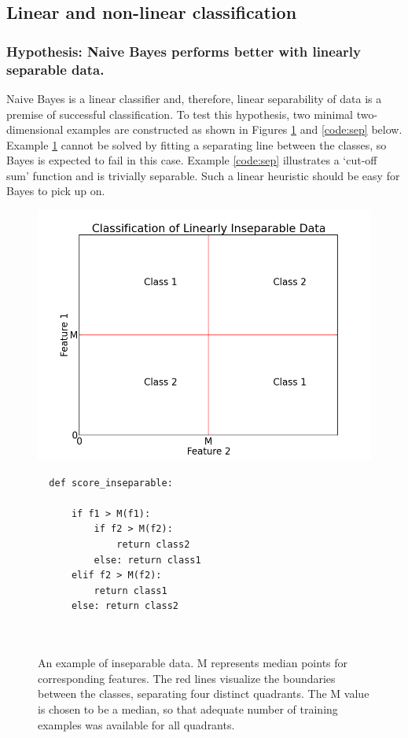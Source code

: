 \documentclass[12pt,notitlepage,twoside]{scrreprt}
\begin{document}
\subsection{Linear and non-linear classification}
\subsubsection*{Hypothesis: Naive Bayes performs better with linearly separable data.}

Naive Bayes is a linear classifier and, therefore, linear separability of data is a
premise of successful classification. To test this hypothesis, two minimal two-dimensional
examples are constructed as shown in Figures \ref{code:insep} and \ref{code:sep} below.
Example \ref{code:insep} cannot be solved by fitting a separating line between the
classes, so Bayes is expected to fail in this case. Example \ref{code:sep} illustrates a
`cut-off sum' function and is trivially separable. Such a linear heuristic should be easy
for Bayes to pick up on.

\begin{figure}[h!]
\begin{minipage}[b]{0.55\linewidth}
  \includegraphics[width=1.2\linewidth]{figs/gen_insep.png}
\end{minipage}
\hspace{0.5cm}
\begin{minipage}[b]{0.4\linewidth}
\begin{verbatim}
  def score_inseparable:

      if f1 > M(f1):
          if f2 > M(f2):
              return class2
          else: return class1
      elif f2 > M(f2): 
          return class1
      else: return class2



\end{verbatim}
\end{minipage}
\caption{An example of inseparable data. M represents median points for corresponding
features.  The red lines visualize the boundaries between the classes, separating four
distinct quadrants. The M value is chosen to be a median, so that adequate number of
training examples was available for all quadrants.  \label{code:insep}}
\end{figure}
\end{document}
